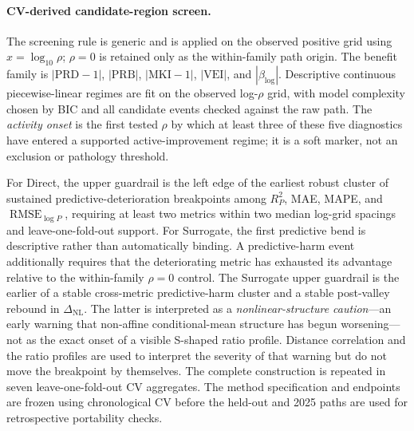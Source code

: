 \documentclass[10pt]{article}
\theoremstyle{definition}
\newcommand{\1}{\mathbf{1}}
\newcommand{\latesttext}[1]{\textcolor{latestPurple}{#1}}
\begin{document}
\paragraph{\latesttext{CV-derived candidate-region screen.}}
{\color{latestPurple}
The screening rule is generic and is applied on the observed positive grid using $x=\log_{10}\rho$; $\rho=0$ is retained only as the within-family path origin. The benefit family is
$|\mathrm{PRD}-1|$, $|\mathrm{PRB}|$, $|\mathrm{MKI}-1|$, $|\mathrm{VEI}|$, and $|\beta_{\log}|$.
Descriptive continuous piecewise-linear regimes are fit on the observed log-$\rho$ grid, with model complexity chosen by BIC and all candidate events checked against the raw path.
The \emph{activity onset} is the first tested $\rho$ by which at least three of these five diagnostics have entered a supported active-improvement regime; it is a soft marker, not an exclusion or pathology threshold.

For Direct, the upper guardrail is the left edge of the earliest robust cluster of sustained predictive-deterioration breakpoints among $R^2_P$, MAE, MAPE, and $\operatorname{RMSE}_{\log P}$, requiring at least two metrics within two median log-grid spacings and leave-one-fold-out support.
For Surrogate, the first predictive bend is descriptive rather than automatically binding. A predictive-harm event additionally requires that the deteriorating metric has exhausted its advantage relative to the within-family $\rho=0$ control. The Surrogate upper guardrail is the earlier of a stable cross-metric predictive-harm cluster and a stable post-valley rebound in $\Delta_{\mathrm{NL}}$. The latter is interpreted as a \emph{nonlinear-structure caution}---an early warning that non-affine conditional-mean structure has begun worsening---not as the exact onset of a visible S-shaped ratio profile. Distance correlation and the ratio profiles are used to interpret the severity of that warning but do not move the breakpoint by themselves.
The complete construction is repeated in seven leave-one-fold-out CV aggregates. The method specification and endpoints are frozen using chronological CV before the held-out and 2025 paths are used for retrospective portability checks.
}
\end{document}
